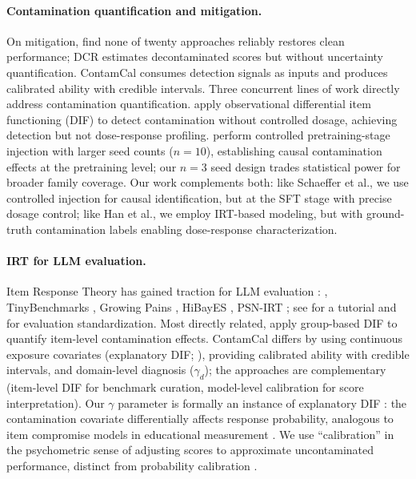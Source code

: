 \paragraph{Contamination quantification and mitigation.}
On mitigation, \citet{sun2025emperor} find none of twenty approaches reliably restores clean performance; DCR \citep{xu2025dcr} estimates decontaminated scores but without uncertainty quantification. ContamCal consumes detection signals as inputs and produces calibrated ability with credible intervals. Three concurrent lines of work directly address contamination quantification. \citet{han2026quantifying} apply observational differential item functioning (DIF) to detect contamination without controlled dosage, achieving detection but not dose-response profiling. \citet{schaeffer2026causally} perform controlled pretraining-stage injection with larger seed counts ($n\!=\!10$), establishing causal contamination effects at the pretraining level; our $n\!=\!3$ seed design trades statistical power for broader family coverage. Our work complements both: like Schaeffer et al., we use controlled injection for causal identification, but at the SFT stage with precise dosage control; like Han et al., we employ IRT-based modeling, but with ground-truth contamination labels enabling dose-response characterization.

\paragraph{IRT for LLM evaluation.}
Item Response Theory \citep{lord_1980_irt,hambleton_1991_irt} has gained traction for LLM evaluation \citep{liang_2023_helm}: \citet{rodriguez2021evaluation}, TinyBenchmarks \citep{polo_2024_tinybenchmarks}, Growing Pains \citep{habba_2025_growing_pains}, HiBayES \citep{luettgau_2025_hibayes}, PSN-IRT \citep{zhou_2025_psnirt}; see \citet{lalor_2024_irt_nlp} for a tutorial and \citet{gu2024olmes} for evaluation standardization. Most directly related, \citet{han2026quantifying} apply group-based DIF \citep{holland_1993_dif} to quantify item-level contamination effects. ContamCal differs by using continuous exposure covariates (explanatory DIF; \citealp{deboeck_2004_explanatory_irt}), providing calibrated ability with credible intervals, and domain-level diagnosis ($\gamma_d$); the approaches are complementary (item-level DIF for benchmark curation, model-level calibration for score interpretation). Our $\gamma$ parameter is formally an instance of explanatory DIF \citep{deboeck_2004_explanatory_irt,eckerly_2017_item_compromise}: the contamination covariate differentially affects response probability, analogous to item compromise models in educational measurement \citep{sinharay_2017_preknowledge,holland_1993_dif,camilli_1994_dif,swaminathan_1990_dif}. We use ``calibration'' in the psychometric sense of adjusting scores to approximate uncontaminated performance, distinct from probability calibration \citep{guo_2017_calibration}.
